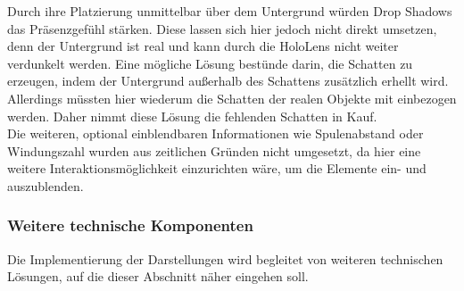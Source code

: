 Durch ihre Platzierung unmittelbar über dem Untergrund würden Drop Shadows das Präsenzgefühl stärken. Diese lassen sich hier jedoch nicht direkt umsetzen, denn der Untergrund ist real und kann durch die HoloLens nicht weiter verdunkelt werden. Eine mögliche Lösung bestünde darin, die Schatten zu erzeugen, indem der Untergrund außerhalb des Schattens zusätzlich erhellt wird. Allerdings müssten hier wiederum die Schatten der realen Objekte mit einbezogen werden. Daher nimmt diese Lösung die fehlenden Schatten in Kauf.\\

Die weiteren, optional einblendbaren Informationen wie Spulenabstand oder Windungszahl wurden aus zeitlichen Gründen nicht umgesetzt, da hier eine weitere Interaktionsmöglichkeit einzurichten wäre, um die Elemente ein- und auszublenden.

\subsubsection{Weitere technische Komponenten}
\label{sec-5-2-4}
Die Implementierung der Darstellungen wird begleitet von weiteren technischen Lösungen, auf die dieser Abschnitt näher eingehen soll.
\vspace{8px}
\begin{center}
	\\
\end{center}
\vspace{6px}

